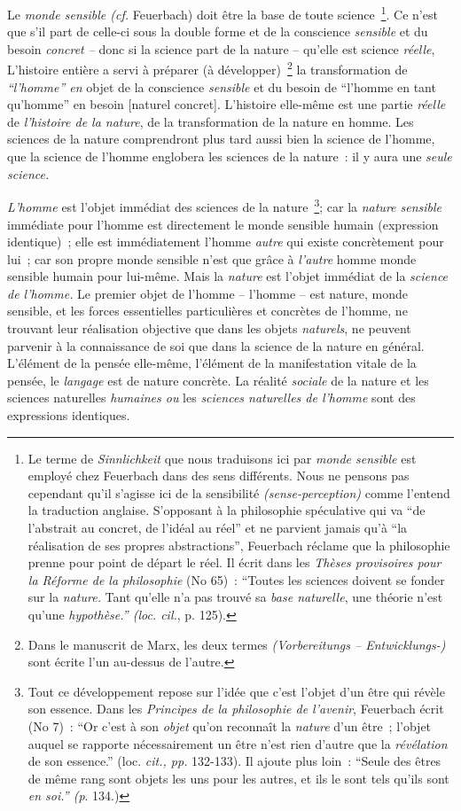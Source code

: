 \documentclass[french,twoside]{book} %
\begin{document}
Le \emph{monde sensible (cf.} Feuerbach) doit être la base de toute science \footnote{Le terme de \emph{Sinnlichkeit} que nous traduisons ici par \emph{monde sensible} est employé chez Feuerbach dans des sens différents. Nous ne pensons pas cependant qu’il s’agisse ici de la sensibilité \emph{(sense-perception)} comme l’entend la traduction anglaise. S’opposant à la philosophie spéculative qui va “de l’abstrait au concret, de l’idéal au réel” et ne parvient jamais qu’à “la réalisation de ses propres abstractions”, Feuerbach réclame que la philosophie prenne pour point de départ le réel. Il écrit dans les \emph{Thèses provisoires pour la Réforme de la philosophie} (No 65) : “Toutes les sciences doivent se fonder sur la \emph{nature.} Tant qu’elle n’a pas trouvé sa \emph{base naturelle}, une théorie n’est qu’une \emph{hypothèse.” (loc. cil.}, p. 125).}. Ce n’est que s’il part de celle-ci sous la double forme et de la conscience \emph{sensible} et du besoin \emph{concret –} donc si la science part de la nature – qu’elle est science \emph{réelle}, L’histoire entière a servi à préparer (à développer) \footnote{Dans le manuscrit de Marx, les deux termes \emph{(Vorbereitungs – Entwicklungs-)} sont écrite l’un au-dessus de l’autre.} la transformation de \emph{“l’homme” en} objet de la conscience \emph{sensible} et du besoin de “l’homme en tant qu’homme” en besoin [naturel concret]. L’histoire elle-même est une partie \emph{réelle} de \emph{l’histoire de la nature}, de la transformation de la nature en homme. Les sciences de la nature comprendront plus tard aussi bien la science de l’homme, que la science de l’homme englobera les sciences de la nature : il y aura une \emph{seule science.}\par
[X] \emph{L’homme} est l’objet immédiat des sciences de la nature \footnote{Tout ce développement repose sur l’idée que c’est l’objet d’un être qui révèle son essence. Dans les \emph{Principes de la philosophie de l’avenir}, Feuerbach écrit (No 7) : “Or c’est à son \emph{objet} qu’on reconnaît la \emph{nature} d’un être ; l’objet auquel se rapporte nécessairement un être n’est rien d’autre que la \emph{révélation} de son essence.” (loc. \emph{cit., pp.} 132-133). Il ajoute plus loin : “Seule des êtres de même rang sont objets les uns pour les autres, et ils le sont tels qu’ils sont \emph{en soi.” (p}. 134.)}; car la \emph{nature sensible} immédiate pour l’homme est directement le monde sensible humain (expression identique) ; elle est immédiatement l’homme \emph{autre} qui existe concrètement pour lui ; car son propre monde sensible n’est que grâce à \emph{l’autre} homme monde sensible humain pour lui-même. Mais la \emph{nature} est l’objet immédiat de la \emph{science de l’homme.} Le premier objet de l’homme – l’homme – est nature, monde sensible, et les forces essentielles particulières et concrètes de l’homme, ne trouvant leur réalisation objective que dans les objets \emph{naturels}, ne peuvent parvenir à la connaissance de soi que dans la science de la nature en général. L’élément de la pensée elle-même, l’élément de la manifestation vitale de la pensée, le \emph{langage} est de nature concrète. La réalité \emph{sociale} de la nature et les sciences naturelles \emph{humaines ou} les \emph{sciences naturelles de l’homme} sont des expressions identiques.\par
\end{document}
